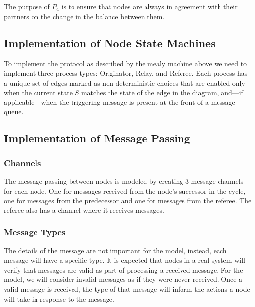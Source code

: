 \documentclass[runningheads]{llncs}
\begin{document}
The purpose of $P_4$ is to ensure that nodes are always in agreement with their partners on the change in the balance between them. 



\subsection{Implementation of Node State Machines} 
To implement the protocol as described by the mealy machine above we need to implement three process types: Originator, Relay, and Referee. Each process has a unique set of edges marked as non-deterministic choices that are enabled only when the current state $S$ matches the state of the edge in the diagram, and---if applicable---when the triggering message is present at the front of a message queue.



\subsection{Implementation of Message Passing}
\subsubsection{Channels}
The message passing between nodes is modeled by creating 3 message channels for each node. One for messages received from the node's successor in the cycle, one for messages from the predecessor and one for messages from the referee. The referee also has a channel where it receives messages.

\subsubsection{Message Types}
The details of the message are not important for the model, instead, each message will have a specific type. It is expected that nodes in a real system will verify that messages are valid as part of processing a received message. For the model, we will consider invalid messages as if they were never received. Once a valid message is received, the type of that message will inform the actions a node will take in response to the message.
\end{document}
